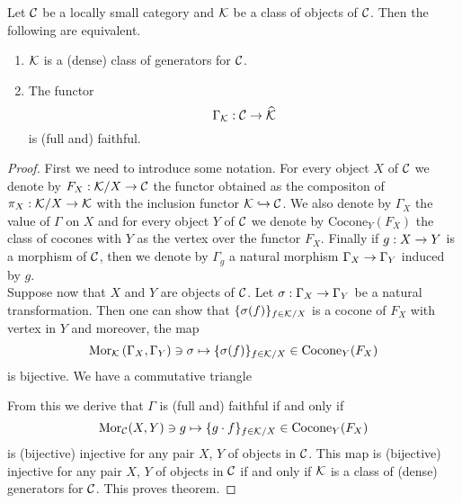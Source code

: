 \begin{theorem}\label{theorem:generatorclassesdescribedcategorically}
Let ${\mathcal C}$ be a locally small category and ${\mathcal K}$ be a class of objects of ${\mathcal C}$. Then the following are equivalent.
\begin{enumerate}[label=\emph{\textbf{(\roman*)}}, leftmargin=1.5em]
\item ${\mathcal K}$ is a (dense) class of generators for ${\mathcal C}$.
\item The functor
$$\Gamma_{{\mathcal K}}:{\mathcal C}\rightarrow \widehat{{\mathcal K}}$$
is (full and) faithful.
\end{enumerate}
\end{theorem}
\begin{proof}
First we need to introduce some notation. For every object $X$ of ${\mathcal C}$ we denote by $F_X:{\mathcal K}/X\rightarrow {\mathcal C}$ the functor obtained as the compositon of $\pi_X:{\mathcal K}/X\rightarrow {\mathcal K}$ with the inclusion functor ${\mathcal K}\hookrightarrow {\mathcal C}$. We also denote by $\Gamma_X$ the value of $\Gamma$ on $X$ and for every object $Y$ of ${\mathcal C}$ we denote by  $\mathrm{Cocone}_Y(F_X)$ the class of cocones with $Y$ as the vertex over the functor $F_X$. Finally if $g:X\rightarrow Y$ is a morphism of ${\mathcal C}$, then we denote by $\Gamma_g$ a natural morphism $\Gamma_X\rightarrow \Gamma_Y$ induced by $g$.\\
Suppose now that $X$ and $Y$ are objects of ${\mathcal C}$. Let $\sigma:\Gamma_X\rightarrow \Gamma_Y$ be a natural transformation. Then one can show that $\{\sigma(f)\}_{f\in {\mathcal K}/X}$ is a cocone of $F_X$ with vertex in $Y$ and moreover, the map
$$\mathrm{Mor}_{{\mathcal K}}\left(\Gamma_X,\Gamma_Y\right)\ni \sigma \mapsto \{\sigma(f)\}_{f\in {\mathcal K}/X}\in \mathrm{Cocone}_{Y}(F_X)$$
is bijective. We have a commutative triangle
\begin{center}
\end{center}
From this we derive that $\Gamma$ is (full and) faithful if and only if 
$$\mathrm{Mor}_{{\mathcal C}}(X,Y)\ni g\mapsto \{g\cdot f\}_{f\in {\mathcal K}/X}\in \mathrm{Cocone}_Y(F_X)$$
 is (bijective) injective for any pair $X$, $Y$ of objects in ${\mathcal C}$. This map is (bijective) injective for any pair $X$, $Y$ of objects in ${\mathcal C}$ if and only if ${\mathcal K}$ is a class of (dense) generators for ${\mathcal C}$. This proves theorem.
\end{proof}

